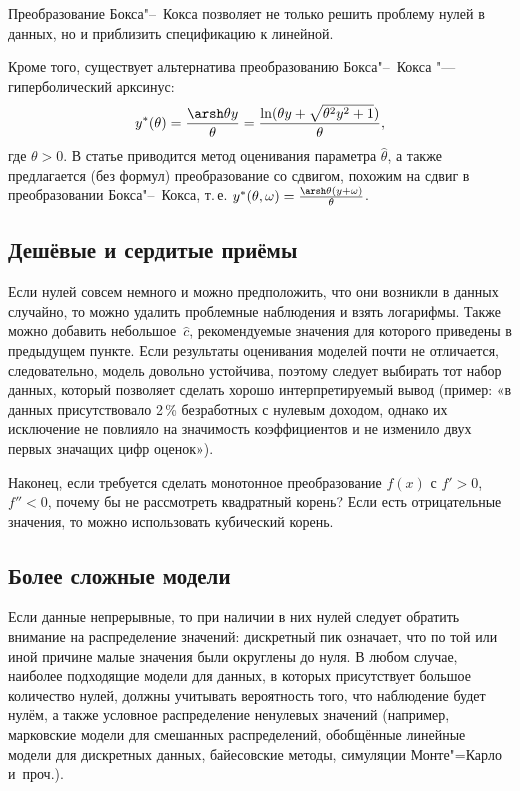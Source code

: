 \documentclass[11pt]{article}
\begin{document}
Преобразование Бокса"--~Кокса позволяет не только решить проблему нулей в данных, но и приблизить спецификацию к линейной.

Кроме того, существует альтернатива преобразованию Бокса"--~Кокса "--- гиперболический арксинус:
\[
y^*(\theta) = \frac{\arsh \theta y}{\theta} = \frac{\ln ( \theta y + \sqrt{\theta^2 y^2 + 1})}{\theta},
\]
где $\theta>0$. В статье \citep{burbidge88} приводится метод оценивания параметра $\hat\theta$, а также предлагается (без формул) преобразование со сдвигом, похожим на сдвиг в преобразовании Бокса"--~Кокса, т.\,е. $y^*(\theta, \omega) = \frac{\arsh \theta (y+\omega)}{\theta}$.

\subsection{Дешёвые и сердитые приёмы}

Если нулей совсем немного и можно предположить, что они возникли в данных случайно, то можно удалить проблемные наблюдения и взять логарифмы. Также можно добавить небольшое~$\hat c$, рекомендуемые значения для которого приведены в предыдущем пункте. Если результаты оценивания моделей почти не отличается, следовательно, модель довольно устойчива, поэтому следует выбирать тот набор данных, который позволяет сделать хорошо интерпретируемый вывод (пример: «в данных присутствовало 2\,\% безработных с нулевым доходом, однако их исключение не повлияло на значимость коэффициентов и не изменило двух первых значащих цифр оценок»).

Наконец, если требуется сделать монотонное преобразование $f(x)$ с $f'>0$, $f''<0$, почему бы не рассмотреть квадратный корень? Если есть отрицательные значения, то можно использовать кубический корень.

\subsection{Более сложные модели}

Если данные непрерывные, то при наличии в них нулей следует обратить внимание на распределение значений: дискретный пик означает, что по той или иной причине малые значения были округлены до нуля. В любом случае, наиболее подходящие модели для данных, в которых присутствует большое количество нулей, должны учитывать вероятность того, что наблюдение будет нулём, а также условное распределение ненулевых значений (например, марковские модели для смешанных распределений, обобщённые линейные модели для дискретных данных, байесовские методы, симуляции Монте"=Карло и~проч.).


\printbibliography
\end{document}
